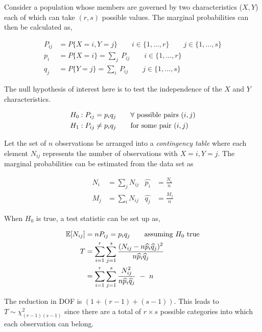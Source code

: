 Consider a population whose members are governed by two characteristics ($ X, Y $) each of which can take $ (r, s) $ possible values. The marginal probabilities can then be calculated as,

\begin{align}
	P_{ij} &= P\{X = i, Y = j\} \qquad i \in \{1, \dots, r\} \qquad j \in \{1, \dots, s\} \\[1ex]
	p_i &= P\{X = i\} = \sum_j\ P_{ij} \qquad i \in \{1, \dots, r\} \\
	q_j &= P\{Y = j\} = \sum_i\ P_{ij} \qquad j \in \{1, \dots, s\}
\end{align}

The null hypothesis of interest here is to test the independence of the $ X $ and $ Y $ characteristics.

\begin{align}
	H_0 &: P_{ij} = p_i q_j \qquad \forall \ \text{possible pairs $ (i, j) $}\\
	H_1 &: P_{ij} \neq p_i q_j \qquad \text{for some pair $ (i, j) $}
\end{align}

Let the set of $ n $ observations be arranged into a  \textit{contingency table} where each element $ N_{ij} $ represents the number of observations with $ X=i, Y=j $. The marginal probabilities can be estimated from the data set as

\begin{align}
	N_i &= \sum_j N_{ij} & \widehat{p_i} &= \frac{N_i}{n} \\
	M_j &= \sum_i N_{ij} & \widehat{q_j} &= \frac{M_j}{n}
\end{align}

When $ H_0 $ is true, a test statistic can be set up as,

\begin{align}
	\mathbb{E}[N_{ij}] &= nP_{ij} = p_i q_j \qquad \text{assuming $ H_0 $ true} \\
	T &= \sum\limits_{i=1}^{r} \sum\limits_{j=1}^{s} \frac{\displaystyle (N_{ij} - n\widehat{p}_i \widehat{q}_j)^2}{\displaystyle n\widehat{p}_i \widehat{q}_j} \nonumber \\
	&= \sum\limits_{i=1}^{r} \sum\limits_{j=1}^{s} \frac{\displaystyle N_{ij}^2}{\displaystyle n\widehat{p}_i \widehat{q}_j}\ -\ n
\end{align}

The reduction in DOF is $ (1 + (r-1) + (s-1)) $. This leads to $ T \sim \chi^2_{(r-1)(s-1)} $ since there are a total of $ r \times s $ possible categories into which each observation can belong.

